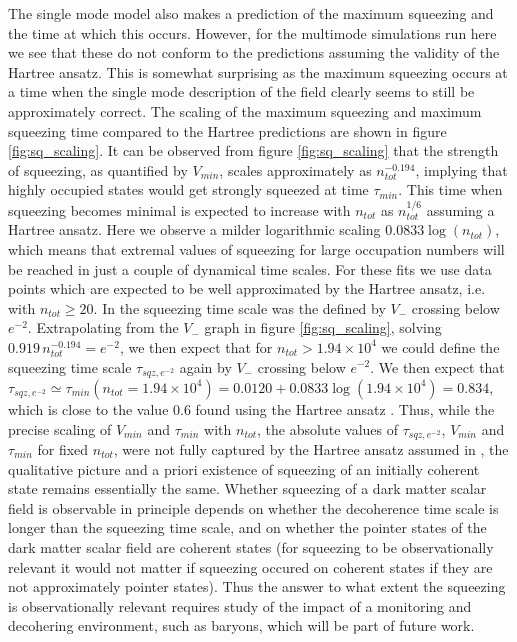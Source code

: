 \documentclass[aps,prd,twocolumn,superscriptaddress]{revtex4-1}
\begin{document}
The single mode model also makes a prediction of the maximum squeezing and the time at which this occurs. However, for the multimode simulations run here we see that these do not conform to the predictions assuming the validity of the Hartree ansatz. This is somewhat surprising as the maximum squeezing occurs at a time when the single mode description of the field clearly seems to still be approximately correct. The scaling of the maximum squeezing and maximum squeezing time compared to the Hartree predictions are shown in figure \ref{fig:sq_scaling}.
It can be observed from figure \ref{fig:sq_scaling} that the strength of squeezing, as quantified by $V_{min}$, scales approximately as $n_{tot}^{-0.194}$, implying that highly occupied states would get strongly squeezed at time $\tau_{min}$. 
This time when squeezing becomes minimal is expected to increase with $n_{tot}$ as $n_{tot}^{1/6}$ assuming a Hartree ansatz. Here we observe a milder logarithmic scaling  $0.0833 \log(n_{tot})$, which means that extremal  values of squeezing for large occupation numbers will be reached in just a couple of dynamical time scales. For these fits we use data points which are expected to be well approximated by the Hartree ansatz, i.e. with $n_{tot} \ge 20$. 
In \cite{KoppFragkosPikovski2021} the squeezing time scale was the defined by $V_-$ crossing below $e^{-2}$. Extrapolating from the $V_-$ graph in figure \ref{fig:sq_scaling}, solving $0.919 \,  n_{tot}^{-0.194} = e^{-2}$, we then expect that for $n_{tot} > 1.94\times10^4$ we could define the squeezing time scale $\tau_{sqz, e^{-2}}$ again by $V_-$ crossing below $e^{-2}$. 
We then expect that $\tau_{sqz, e^{-2}} \simeq \tau_{min}(n_{tot}= 1.94\times10^4) = 0.0120 + 0.0833 \log(1.94\times10^4) = 0.834$, which is close to the value $0.6$ found using the Hartree ansatz \cite{KoppFragkosPikovski2021}.
Thus, while the precise scaling of $V_{min}$ and $\tau_{min}$ with $n_{tot}$, the absolute values of $\tau_{sqz, e^{-2}}$, $V_{min}$ and $\tau_{min}$ for fixed $n_{tot}$, were not fully captured by the Hartree ansatz assumed in \cite{KoppFragkosPikovski2021}, the qualitative picture and a priori existence of squeezing of an initially coherent state remains essentially the same.  
Whether squeezing of a dark matter scalar field is observable in principle depends on whether the decoherence time scale is longer than the squeezing time scale, and on whether the pointer states of the dark matter scalar field are coherent states (for  squeezing to be observationally relevant it would not matter if squeezing occured on coherent states if they are not approximately pointer states).
Thus the answer to what extent the squeezing is observationally relevant requires study of the impact of a monitoring and decohering environment, such as baryons, which will be part of future work.
\end{document}
